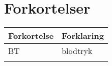 \chapter{Forkortelser}

\begin{longtabu} to 
    Forkortelse &    Forklaring\\
    \toprule
    BT &    blodtryk\\
\label{forkort}
\end{longtabu}